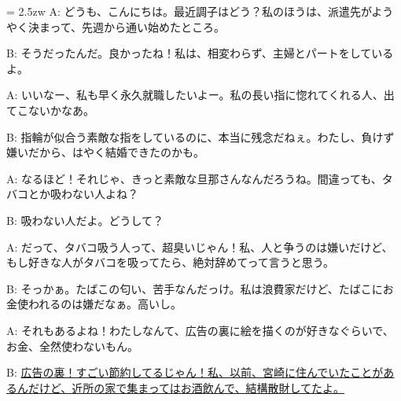 \documentclass[11pt]{amsart}
\title{}
\author{}
\newenvironment{hangall}[1]{\hangindent = 2.5zw\everypar{\hangindent = 2.5zw}}{}
\begin{document}
\maketitle
\begin{hangall}{}%
A: どうも、こんにちは。最近調子はどう？私のほうは、派遣先がようやく決まって、先週から通い始めたところ。

B: そうだったんだ。良かったね！私は、相変わらず、主婦とパートをしているよ。

A: いいなー、私も早く永久就職したいよー。私の長い指に惚れてくれる人、出てこないかなあ。

B: 指輪が似合う素敵な指をしているのに、本当に残念だねぇ。わたし、負けず嫌いだから、はやく結婚できたのかも。

A: なるほど！それじゃ、きっと素敵な旦那さんなんだろうね。間違っても、タバコとか吸わない人よね？

B: 吸わない人だよ。どうして？

A: だって、タバコ吸う人って、超臭いじゃん！私、人と争うのは嫌いだけど、もし好きな人がタバコを吸ってたら、絶対辞めてって言うと思う。

B: そっかぁ。たばこの匂い、苦手なんだっけ。私は浪費家だけど、たばこにお金使われるのは嫌だなぁ。高いし。

A: それもあるよね！わたしなんて、広告の裏に絵を描くのが好きなぐらいで、お金、全然使わないもん。

B: \ul{広告の裏！すごい節約してるじゃん！私、以前、宮崎に住んでいたことがあるんだけど、近所の家で集まってはお酒飲んで、結構散財してたよ。}\end{hangall}
\end{document}

